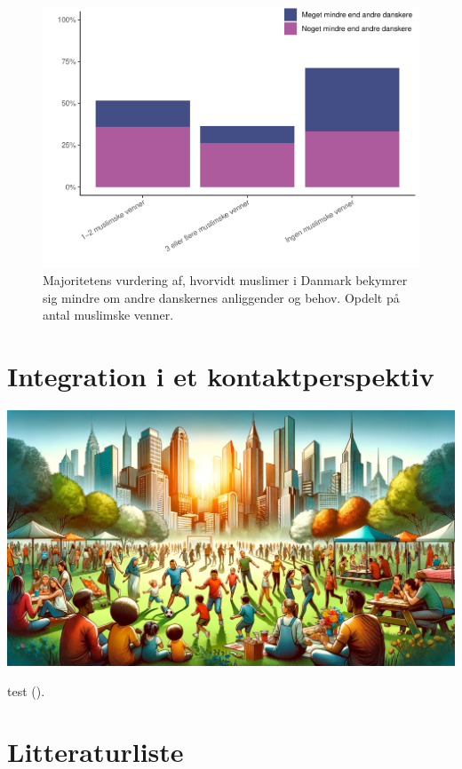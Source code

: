 \documentclass[
]{book}
\begin{document}
\begin{figure}
\includegraphics[width=1\linewidth]{en-befolkning-blander-sig_files/figure-latex/fig-6-6-1} \caption{Majoritetens vurdering af, hvorvidt muslimer i Danmark bekymrer sig mindre om andre danskernes anliggender og behov. Opdelt på antal muslimske venner.}\label{fig:fig-6-6}
\end{figure}

\chapter{Integration i et kontaktperspektiv}\label{kap7}

\includegraphics[width=1\linewidth]{images/dalle-integration}

test ().

\chapter*{Litteraturliste}\label{litteraturliste}
\end{document}
